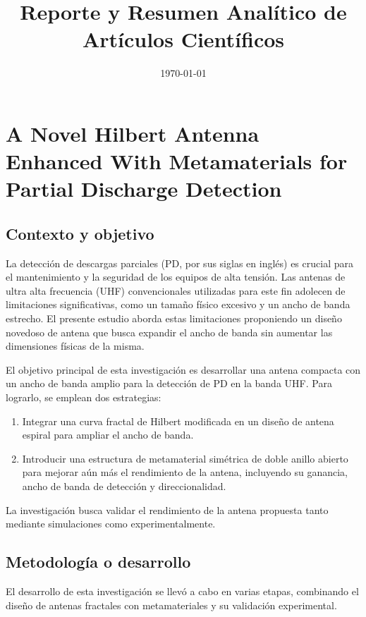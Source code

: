 \documentclass[11pt,a4paper]{article}
\title{Reporte y Resumen Analítico de Artículos Científicos}
\date{\today}
\begin{document}
\maketitle
\tableofcontents
\newpage

\newpage
\section{A Novel Hilbert Antenna Enhanced With Metamaterials for Partial Discharge Detection}

\subsection*{Contexto y objetivo}
La detección de descargas parciales (PD, por sus siglas en inglés) es crucial para el mantenimiento y la seguridad de los equipos de alta tensión. Las antenas de ultra alta frecuencia (UHF) convencionales utilizadas para este fin adolecen de limitaciones significativas, como un tamaño físico excesivo y un ancho de banda estrecho. El presente estudio aborda estas limitaciones proponiendo un diseño novedoso de antena que busca expandir el ancho de banda sin aumentar las dimensiones físicas de la misma.

El objetivo principal de esta investigación es desarrollar una antena compacta con un ancho de banda amplio para la detección de PD en la banda UHF. Para lograrlo, se emplean dos estrategias:
\begin{enumerate}
    \item Integrar una curva fractal de Hilbert modificada en un diseño de antena espiral para ampliar el ancho de banda.
    \item Introducir una estructura de metamaterial simétrica de doble anillo abierto para mejorar aún más el rendimiento de la antena, incluyendo su ganancia, ancho de banda de detección y direccionalidad.
\end{enumerate}
La investigación busca validar el rendimiento de la antena propuesta tanto mediante simulaciones como experimentalmente.

\subsection*{Metodología o desarrollo}
El desarrollo de esta investigación se llevó a cabo en varias etapas, combinando el diseño de antenas fractales con metamateriales y su validación experimental.
\end{document}

